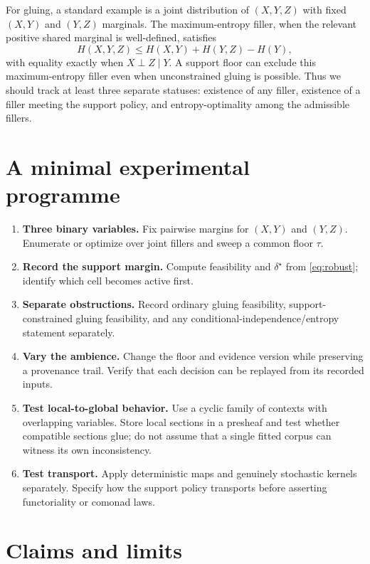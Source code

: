 \documentclass[11pt]{article}
\begin{document}
For gluing, a standard example is a joint distribution of $(X,Y,Z)$ with fixed $(X,Y)$ and $(Y,Z)$ marginals. The maximum-entropy filler, when the relevant positive shared marginal is well-defined, satisfies
\[
 H(X,Y,Z)\leq H(X,Y)+H(Y,Z)-H(Y),
\]
with equality exactly when $X\perp Z\mid Y$. A support floor can exclude this maximum-entropy filler even when unconstrained gluing is possible. Thus we should track at least three separate statuses: existence of any filler, existence of a filler meeting the support policy, and entropy-optimality among the admissible fillers.

\section{A minimal experimental programme}

\begin{enumerate}[leftmargin=2em]
  \item \textbf{Three binary variables.} Fix pairwise margins for $(X,Y)$ and $(Y,Z)$. Enumerate or optimize over joint fillers and sweep a common floor $\tau$.
  \item \textbf{Record the support margin.} Compute feasibility and $\delta^\star$ from \eqref{eq:robust}; identify which cell becomes active first.
  \item \textbf{Separate obstructions.} Record ordinary gluing feasibility, support-constrained gluing feasibility, and any conditional-independence/entropy statement separately.
  \item \textbf{Vary the ambience.} Change the floor and evidence version while preserving a provenance trail. Verify that each decision can be replayed from its recorded inputs.
  \item \textbf{Test local-to-global behavior.} Use a cyclic family of contexts with overlapping variables. Store local sections in a presheaf and test whether compatible sections glue; do not assume that a single fitted corpus can witness its own inconsistency.
  \item \textbf{Test transport.} Apply deterministic maps and genuinely stochastic kernels separately. Specify how the support policy transports before asserting functoriality or comonad laws.
\end{enumerate}

\section{Claims and limits}
\end{document}
